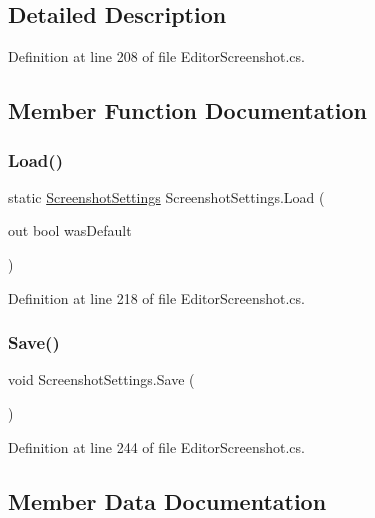 \subsection{Detailed Description}


Definition at line 208 of file Editor\+Screenshot.\+cs.



\subsection{Member Function Documentation}
\mbox{\label{class_screenshot_settings_abcc070c37ede994593e90026b80b67af}} 
\subsubsection{\texorpdfstring{Load()}{Load()}}
{\footnotesize\ttfamily static \mbox{\hyperlink{class_screenshot_settings}{Screenshot\+Settings}} Screenshot\+Settings.\+Load (\begin{DoxyParamCaption}\item[{out bool}]{was\+Default }\end{DoxyParamCaption})\hspace{0.3cm}{\ttfamily [static]}}



Definition at line 218 of file Editor\+Screenshot.\+cs.

\mbox{\label{class_screenshot_settings_a2491e22a763d7c1ddea9af68b596f8c8}} 
\subsubsection{\texorpdfstring{Save()}{Save()}}
{\footnotesize\ttfamily void Screenshot\+Settings.\+Save (\begin{DoxyParamCaption}{ }\end{DoxyParamCaption})}



Definition at line 244 of file Editor\+Screenshot.\+cs.



\subsection{Member Data Documentation}
\mbox{\label{class_screenshot_settings_a6e8589289fbe31245230484a6bf5f920}} 
